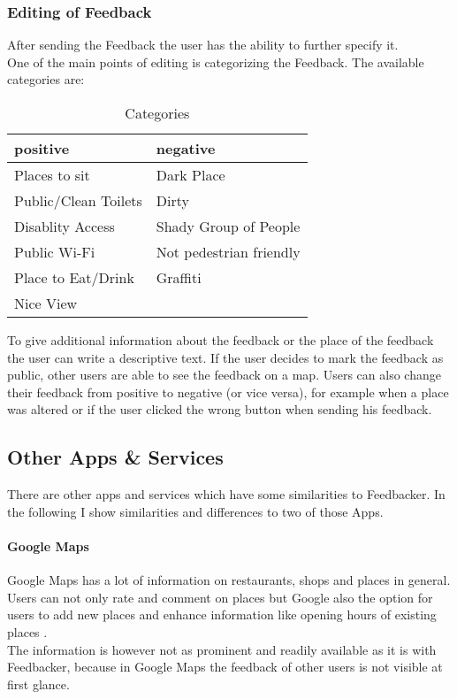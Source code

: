 \subsubsection{Editing of Feedback}
After sending the Feedback the user has the ability to further specify it. \\
One of the main points of editing is categorizing the Feedback. The available categories are:
\begin{table}[h]
\begin{center}
\begin{tabular}{l  l}
positive & negative \\
\hline
  Places to sit & Dark Place \\
  Public/Clean Toilets & Dirty \\
  Disablity Access & Shady Group of People \\
  Public Wi-Fi & Not pedestrian friendly \\
  Place to Eat/Drink & Graffiti \\
  Nice View & \\
\end{tabular}
 \caption{Categories}\label{tab_categories}
 \label{table:categories}
\end{center}
\end{table}

To give additional information about the feedback or the place of the feedback the user can write a descriptive text. If the user decides to mark the feedback as public, other users are able to see the feedback on a map. Users can also change their feedback from positive to negative (or vice versa), for example when a place was altered or if the user clicked the wrong button when sending his feedback.

\subsection{Other Apps \& Services}
There are other apps and services which have some similarities to Feedbacker. In the following I show similarities and differences to two of those Apps.

\paragraph{Google Maps}
Google Maps has a lot of information on restaurants, shops and places in general. Users can not only rate and comment on places but Google also the option for users to add new places and enhance information like opening hours of existing places \cite{gMaps}.\\
The information is however not as prominent and readily available as it is with Feedbacker, because in Google Maps the feedback of other users is not visible at first glance.


